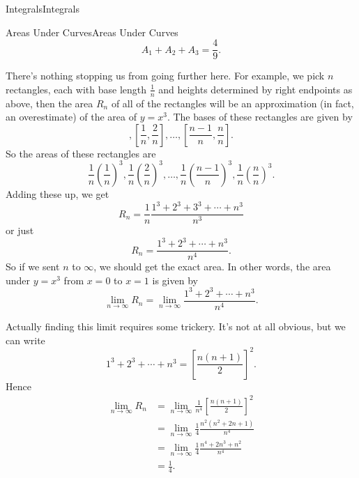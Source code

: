 \documentclass[10pt,]{book}
\numberwithin{equation}{section}
\begin{document}
\begin{chapterptx}{Integrals}{}{Integrals}{}{}
\begin{sectionptx}{Areas Under Curves}{}{Areas Under Curves}{}{}
\begin{equation*}
A_{1} + A_{2} + A_{3} = \frac{4}{9}.
\end{equation*}
%
\par
\hypertarget{p-405}{}%
There's nothing stopping us from going further here. For example, we pick \(n\) rectangles, each with base length \(\frac{1}{n}\) and heights determined by right endpoints as above, then the area \(R_{n}\) of all of the rectangles will be an approximation (in fact, an overestimate) of the area of \(y = x^{3}\). The bases of these rectangles are given by%
\begin{equation*}
[0,\frac{1}{n}], [\frac{1}{n},\frac{2}{n}],\ldots,[\frac{n-1}{n},\frac{n}{n}].
\end{equation*}
So the areas of these rectangles are%
\begin{equation*}
\frac{1}{n}\left(\frac{1}{n}\right)^{3}, \frac{1}{n}\left(\frac{2}{n}\right)^{3},\ldots,\frac{1}{n}\left(\frac{n-1}{n}\right)^{3}, \frac{1}{n}\left(\frac{n}{n}\right)^{3}.
\end{equation*}
Adding these up, we get%
\begin{equation*}
R_{n} = \frac{1}{n}\frac{1^{3}+2^{3} + 3^{3} + \cdots + n^{3}}{n^{3}}
\end{equation*}
or just%
\begin{equation*}
R_{n} = \frac{1^{3} + 2^{3} + \cdots + n^{3}}{n^{4}}.
\end{equation*}
So if we sent \(n\) to \(\infty\), we should get the exact area. In other words, the area under \(y=x^{3}\) from \(x=0\) to \(x=1\) is given by%
\begin{equation*}
\lim_{n\to\infty}R_{n} = \lim_{n\to\infty}\frac{1^{3} + 2^{3} + \cdots + n^{3}}{n^{4}}.
\end{equation*}
%
\par
\hypertarget{p-406}{}%
Actually finding this limit requires some trickery. It's not at all obvious, but we can write%
\begin{equation*}
1^{3} + 2^{3} + \cdots + n^{3} = \left[\frac{n(n+1)}{2}\right]^{2}.
\end{equation*}
Hence%
\begin{align*}
\lim_{n\to\infty}R_{n} & = \lim_{n\to\infty}\frac{1}{n^{4}}\left[\frac{n(n+1)}{2}\right]^{2} \\
& = \lim_{n\to\infty}\frac{1}{4}\frac{n^{2}(n^{2}+2n+1)}{n^{4}} \\
& = \lim_{n\to\infty}\frac{1}{4}\frac{n^{4} + 2n^{3} + n^{2}}{n^{4}} \\
& = \frac{1}{4}. 

\end{align*}
\end{sectionptx}
\end{chapterptx}
\end{document}
